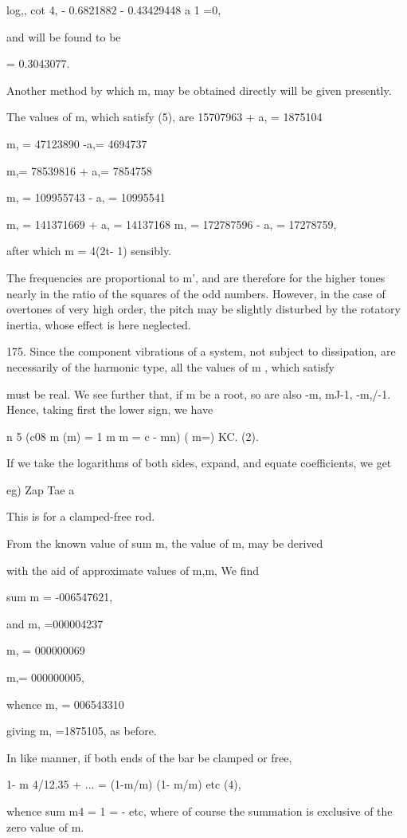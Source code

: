 log,, cot 4, - 0.6821882 - 0.43429448 a 1 =0,

and will be found to be

= 0.3043077.

Another method by which m, may be obtained directly will be given
presently.

The values of m, which satisfy (5), are 15707963 + a, = 1875104

m, = 47123890 -a,= 4694737

m,= 78539816 + a,= 7854758

m, = 109955743 - a, = 10995541

m, = 141371669 + a, = 14137168 m, = 172787596 - a, = 17278759,

after which m = 4(2t- 1) sensibly.

The frequencies are proportional to m', and are therefore for the higher
tones nearly in the ratio of the squares of the odd numbers. However, in
the case of overtones of very high order, the pitch may be slightly
disturbed by the rotatory inertia, whose effect is here neglected.

175. Since the component vibrations of a system, not subject to
dissipation, are necessarily of the harmonic type, all the values of m ,
which satisfy

must be real. We see further that, if m be a root, so are also -m, mJ-1,
-m,/-1. Hence, taking first the lower sign, we have

n 5 (c08 m (m) = 1 m m = c - mn) ( m=) KC. (2).

If we take the logarithms of both sides, expand, and equate
coefficients, we get

eg) Zap Tae a

This is for a clamped-free rod.


From the known value of sum m, the value of m, may be derived

with the aid of approximate values of m,m, We find

sum m = -006547621,

and m, =000004237

m, = 000000069

m,= 000000005,

whence m, = 006543310

giving m, =1875105, as before.

In like manner, if both ends of the bar be clamped or free,

1- m 4/12.35 + ... = (1-m/m) (1- m/m) etc (4),

whence sum m4 = 1 = - etc, where of course the summation is exclusive of
the zero value of m.

